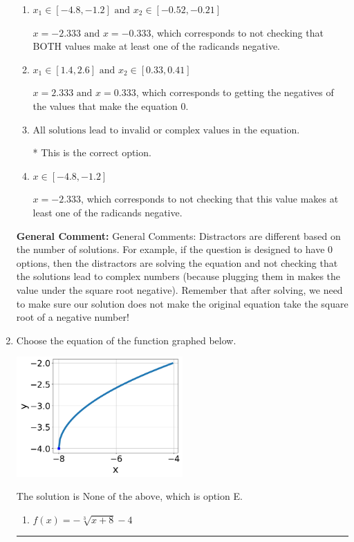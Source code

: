 \documentclass{extbook}[14pt]
\newcommand{\litem}[1]{\item #1

\rule{\textwidth}{0.4pt}}
\begin{document}
\begin{enumerate}
{\begin{enumerate}[label=\Alph*.]
$x = -0.333$, which corresponds to not checking that this value makes at least one of the radicands negative.
\item \( x_1 \in [-4.8, -1.2] \text{ and } x_2 \in [-0.52,-0.21] \)

$x = -2.333 \text{ and } x = -0.333$, which corresponds to not checking that BOTH values make at least one of the radicands negative.
\item \( x_1 \in [1.4, 2.6] \text{ and } x_2 \in [0.33,0.41] \)

$x = 2.333 \text{ and } x = 0.333$, which corresponds to getting the negatives of the values that make the equation 0.
\item \( \text{All solutions lead to invalid or complex values in the equation.} \)

* This is the correct option.
\item \( x \in [-4.8,-1.2] \)

$x = -2.333$, which corresponds to not checking that this value makes at least one of the radicands negative.
\end{enumerate}

\textbf{General Comment:} General Comments: Distractors are different based on the number of solutions. For example, if the question is designed to have 0 options, then the distractors are solving the equation and not checking that the solutions lead to complex numbers (because plugging them in makes the value under the square root negative). Remember that after solving, we need to make sure our solution does not make the original equation take the square root of a negative number!
}
\litem{
Choose the equation of the function graphed below.

\begin{center}
    \includegraphics[width=0.5\textwidth]{../Figures/radicalGraphToEquationCopyA.png}
\end{center}



The solution is \( \text{None of the above} \), which is option E.\begin{enumerate}[label=\Alph*.]
\item \( f(x) = - \sqrt[3]{x + 8} - 4 \)


\end{enumerate}}
\end{enumerate}
\end{document}
